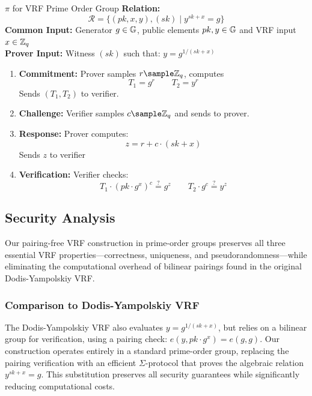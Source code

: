 \begin{protocol}{$\pi$ for VRF Prime Order Group}{}\label{pok-vrf-prime-order-group}
\textbf{Relation: }
\[
\mathcal{R} = \{(pk, x, y), (sk) \mid y^{sk+x} = g\}
\]
\textbf{Common Input:} Generator $g \in \mathbb{G}$, public elements $pk, y \in \mathbb{G}$ and VRF input $x \in \mathbb{Z}_q$\\
\textbf{Prover Input:} Witness $(sk)$ such that: $y = g^{1/(sk + x)}$
\begin{enumerate}
    \item \textbf{Commitment:} Prover samples $r \sample \Z_q$, computes 
    \[
    T_1 = g^r \qquad T_2 = y^r
    \]
    Sends $(T_1, T_2)$ to verifier.
    
    \item \textbf{Challenge:} Verifier samples $c \sample \mathbb{Z}_q$ and sends to prover.
    
    \item \textbf{Response:} Prover computes:
    \[
    z = r + c \cdot (sk + x)
    \]
    Sends $z$ to verifier
    
    \item \textbf{Verification:} Verifier checks:
    \[
    T_1 \cdot (pk \cdot g^x)^c \stackrel{?}{=} g^z \qquad T_2 \cdot g^c \stackrel{?}{=} y^z
    \]
 
\end{enumerate}
\end{protocol}

\subsection{Security Analysis}

Our pairing-free VRF construction in prime-order groups preserves all three essential VRF properties—correctness, uniqueness, and pseudorandomness—while eliminating the computational overhead of bilinear pairings found in the original Dodis-Yampolskiy VRF.

\subsubsection{Comparison to Dodis-Yampolskiy VRF}
The Dodis-Yampolskiy VRF also evaluates $y = g^{1/(sk + x)}$, but relies on a bilinear group for verification, using a pairing check: $e(y, pk \cdot g^x) = e(g, g)$. Our construction operates entirely in a standard prime-order group, replacing the pairing verification with an efficient $\Sigma$-protocol that proves the algebraic relation $y^{sk+x} = g$. This substitution preserves all security guarantees while significantly reducing computational costs.

